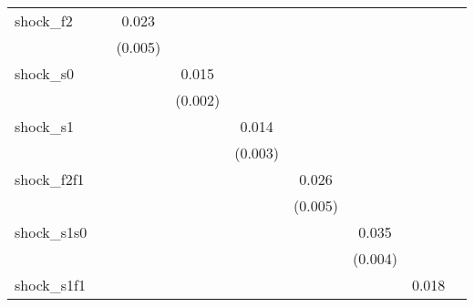 {\begin{tabular}{l*{8}{c}}
\addlinespace
shock\_f2    &                     &       0.023\sym{***}&                     &                     &                     &                     &                     &                     \\
            &                     &     (0.005)         &                     &                     &                     &                     &                     &                     \\
\addlinespace
shock\_s0    &                     &                     &       0.015\sym{***}&                     &                     &                     &                     &                     \\
            &                     &                     &     (0.002)         &                     &                     &                     &                     &                     \\
\addlinespace
shock\_s1    &                     &                     &                     &       0.014\sym{***}&                     &                     &                     &                     \\
            &                     &                     &                     &     (0.003)         &                     &                     &                     &                     \\
\addlinespace
shock\_f2f1  &                     &                     &                     &                     &       0.026\sym{***}&                     &                     &                     \\
            &                     &                     &                     &                     &     (0.005)         &                     &                     &                     \\
\addlinespace
shock\_s1s0  &                     &                     &                     &                     &                     &       0.035\sym{***}&                     &                     \\
            &                     &                     &                     &                     &                     &     (0.004)         &                     &                     \\
\addlinespace
shock\_s1f1  &                     &                     &                     &                     &                     &                     &       0.018\sym{**} &                     \\

\end{tabular}}
